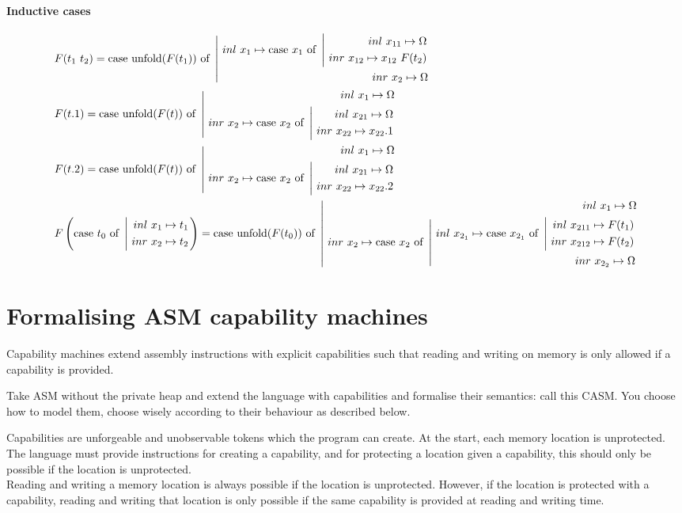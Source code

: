 \documentclass{article}
\newcommand{\unfold}[0]{\ensuremath{\text{unfold}}}
\begin{document}
\paragraph{Inductive cases}
\begin{align*}
        & F(t_1\ t_2) = \case{\ \unfold(F(t_1))}{\inl x_1 \mapsto \case{\ x_1}{\inl x_{11}\mapsto \Omega}{\inr x_{12}\mapsto x_{12}\ F(t_2)}}{\inr x_2 \mapsto \Omega} \\
        & F(t.1) = \case{\ \unfold(F(t))}{\inl x_1 \mapsto \Omega}{\inr x_2 \mapsto \case{\ x_2}{\inl x_{21}\mapsto \Omega}{\inr x_{22}\mapsto x_{22}.1}} \\
        & F(t.2) = \case{\ \unfold(F(t))}{\inl x_1 \mapsto \Omega}{\inr x_2 \mapsto \case{\ x_2}{\inl x_{21}\mapsto \Omega}{\inr x_{22}\mapsto x_{22}.2}} \\
        & F\left(\case{\ t_0}{\inl x_1 \mapsto t_1}{\inr x_2 \mapsto t_2}\right) = \case{\ \unfold(F(t_0))}{\inl x_1 \mapsto \Omega}{\inr x_2 \mapsto \case{\ x_2}{\inl x_{2_1}\mapsto \case{\ x_{2_1}}{\inl x_{211}\mapsto F(t_1)}{\inr x_{212}\mapsto F(t_2)} }{\inr x_{2_2}\mapsto \Omega}}
\end{align*}

\newpage
\section{Formalising ASM capability machines}
Capability machines extend assembly instructions with explicit capabilities such that reading and writing on memory is only allowed if a capability is provided.

Take ASM without the private heap and extend the language with capabilities and formalise their semantics: call this CASM. You choose how to model them, choose wisely according to their behaviour as described below.

Capabilities are unforgeable and unobservable tokens which the program can create. At the start, each memory location is unprotected. The language must provide instructions for creating a capability, and for protecting a location given a capability, this should only be possible if the location is unprotected. \\
Reading and writing a memory location is always possible if the location is unprotected. However, if the location is protected with a capability, reading and writing that location is only possible if the same capability is provided at reading and writing time.

\hline
\end{document}

